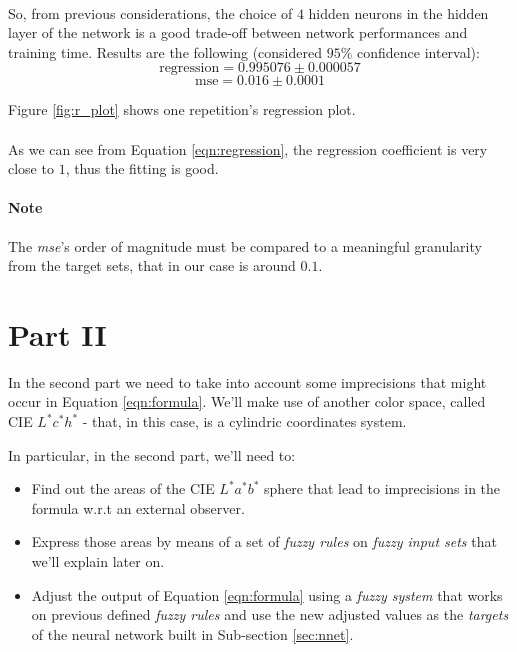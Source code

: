 \documentclass[twocolumn,a4paper]{article}
\begin{document}
\paragraph{} So, from previous considerations, the choice of $4$ hidden neurons in the hidden layer of the network is a good trade-off between network performances and training time.
Results are the following (considered $95\%$ confidence interval):
\begin{equation}\label{eqn:regression}
    \text{regression} = 0.995076 \pm 0.000057
\end{equation}
\begin{equation}
    \text{mse} = 0.016 \pm 0.0001
\end{equation}

Figure \ref{fig:r_plot} shows one repetition's regression plot.
\paragraph{} As we can see from Equation \ref{eqn:regression}, the regression coefficient is very close to $1$, thus the fitting is good.
\paragraph{Note}The \textit{mse}'s order of magnitude must be compared to a meaningful granularity from the target sets, that in our case is around $0.1$.
\clearpage
\section{Part II}
In the second part we need to take into account some imprecisions that might occur in Equation \ref{eqn:formula}. 
We'll make use of another color space, called CIE $L^{*}c^{*}h^{*}$ - that, in this case, is a cylindric coordinates system.

In particular, in the second part, we'll need to:
\begin{itemize}
	\item Find out the areas of the CIE $L^*a^*b^*$ sphere that lead to imprecisions in the formula w.r.t an external observer.
	\item Express those areas by means of a set of \textit{fuzzy rules} on \textit{fuzzy input sets} that we'll explain later on.
	\item Adjust the output of Equation \ref{eqn:formula} using a \textit{fuzzy system} that works on previous defined \textit{fuzzy rules} and use the new adjusted values as the \textit{targets} of the neural network built in Sub-section \ref{sec:nnet}.
\end{itemize}
\end{document}
